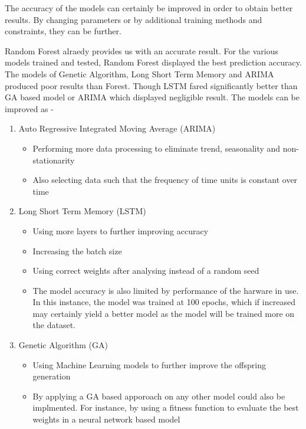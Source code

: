 \documentclass[BTech]{srmuthesis}
\begin{document}
The accuracy of the models can certainly be improved in order to obtain better results. By changing parameters or by additional training methods and constraints, they can be further.

Random Forest alraedy provides us with an accurate result.
For the various models trained and tested, Random Forest displayed the best prediction accuracy. The models of Genetic Algorithm, Long Short Term Memory and ARIMA produced poor results than Forest. Though LSTM fared significantly better than GA based model or ARIMA which displayed negligible result.
The models can be improved as -

\begin{enumerate}
	\item Auto Regressive Integrated Moving Average (ARIMA)
	\begin{itemize}
		\item Performing more data processing to eliminate trend, seasonality and non-stationarity
		\item Also selecting data such that the frequency of time units is constant over time
	\end{itemize}
	\item Long Short Term Memory (LSTM)
	\begin{itemize}
		\item Using more layers to further improving accuracy
		\item Increasing the batch size
		\item Using correct weights after analysing instead of a random seed
		\item The model accuracy is also limited by performance of the harware in use. In this instance, the model was trained at 100 epochs, which if increased may certainly yield a better model as the model will be trained more on the dataset.
	\end{itemize}
	\item Genetic Algorithm (GA)
	\begin{itemize}
		\item Using Machine Learning models to further improve the offspring generation
		\item By applying a GA based apporoach on any other model could also be implmented. For instance, by using a fitness function to evaluate the best weights in a neural network based model
	\end{itemize}
\end{enumerate}
\end{document}
